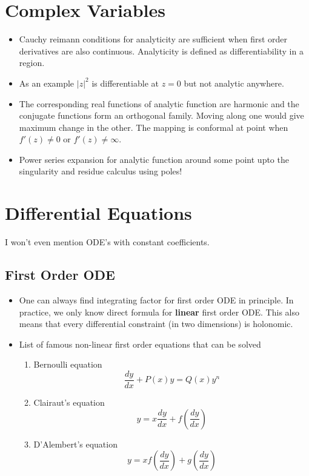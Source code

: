\documentclass{report}
\begin{document}
\chapter{Complex Variables}

\begin{itemize}

\item Cauchy reimann conditions for analyticity are sufficient when first order derivatives are also continuous. Analyticity is defined as differentiability in a region. 

\item As an example $|z|^2$ is differentiable at $z=0$ but not analytic anywhere.

\item The corresponding real functions of analytic function are harmonic and the conjugate functions form an orthogonal family. Moving along one would give maximum change in the other. The mapping is conformal at point when $f'(z) \neq 0$ or $f'(z) \neq \infty$.

\item Power series expansion for analytic function around some point upto the singularity and residue calculus using poles!

\end{itemize}

\chapter{Differential Equations}

I won't even mention ODE's with constant coefficients.
\section{First Order ODE}

\begin{itemize}
\item One can always find integrating factor for first order ODE in principle. In practice, we only know direct formula for \textbf{linear} first order ODE. This also means that every differential constraint (in two dimensions) is holonomic.

\item List of famous non-linear first order equations that can be solved
\begin{enumerate}
\item Bernoulli equation
  $$\frac{dy}{dx} + P(x)y = Q(x)y^n$$
\item Clairaut's equation
  $$y = x\frac{dy}{dx} + f\left(\frac{dy}{dx}\right)$$
\item D'Alembert's equation
  $$y = xf\left(\frac{dy}{dx}\right) + g\left(\frac{dy}{dx}\right)$$
\end{enumerate}

\end{itemize}
\end{document}
